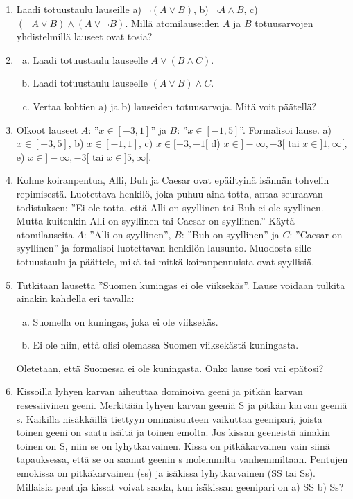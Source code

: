 \begin{enumerate}
\item
Laadi totuustaulu lauseille a) $\lnot(A\lor B)$,  b)  $\lnot A\land B$,  c) $ (\lnot A\lor B)\land (A\lor \lnot B)$. Millä atomilauseiden $A$ ja  $B$ totuusarvojen yhdistelmillä lauseet ovat tosia?

\item
\begin{enumerate}[a)]
\item Laadi totuustaulu lauseelle $A\lor (B\land C)$.  
\item Laadi totuustaulu lauseelle $(A\lor B)\land C$. 
\item Vertaa kohtien a) ja b) lauseiden totuusarvoja. Mitä voit päätellä?
\end{enumerate}

\item Olkoot lauseet $A$: ''$x\in [-3, 1]$'' ja $B$: ''$ x \in [-1,5]$''. Formalisoi lause.
a) $x\in [-3, 5]$, b) $x\in [-1, 1]$,   c)  $x\in [-3, -1[$  d)  $x\in ]-\infty, -3[$  tai $x\in ]1, \infty[$, 
e) $x\in]-\infty, -3[$  tai $x\in ]5, \infty[$.  

\item Kolme koiranpentua, Alli, Buh ja Caesar ovat epäiltyinä isännän tohvelin repimisestä. Luotettava henkilö, joka puhuu aina totta, antaa seuraavan todistuksen: ''Ei ole totta, että Alli on syyllinen tai Buh ei ole syyllinen. Mutta kuitenkin Alli on syyllinen tai Caesar on syyllinen.'' Käytä atomilauseita $A$: ''Alli on syyllinen'', $B$: ''Buh on syyllinen'' ja $C$: ''Caesar on syyllinen'' ja formalisoi luotettavan henkilön lausunto. Muodosta sille totuustaulu ja päättele, mikä tai mitkä koiranpennuista ovat syyllisiä. 

\item Tutkitaan lausetta ''Suomen kuningas ei ole viiksekäs''. Lause voidaan tulkita ainakin kahdella eri tavalla:
\begin{enumerate}[a)]
\item Suomella on kuningas, joka ei ole viiksekäs.
\item Ei ole niin, että olisi olemassa Suomen viiksekästä kuningasta.
\end{enumerate}
Oletetaan, että Suomessa ei ole kuningasta. Onko lause tosi vai epätosi?

\item
Kissoilla lyhyen karvan aiheuttaa dominoiva geeni ja pitkän karvan resessiivinen geeni. Merkitään lyhyen karvan geeniä S ja pitkän karvan geeniä s. Kaikilla nisäkkäillä tiettyyn ominaisuuteen vaikuttaa geenipari, joista toinen geeni on saatu isältä ja toinen emolta. Jos kissan geeneistä ainakin toinen on S, niin se on lyhytkarvainen. Kissa on pitkäkarvainen vain siinä tapauksessa, että se on saanut geenin s molemmilta vanhemmiltaan.  Pentujen emokissa on pitkäkarvainen (ss) ja isäkissa lyhytkarvainen (SS tai Ss). Millaisia pentuja kissat voivat saada, kun isäkissan geenipari on a) SS b) Ss?

\end{enumerate}

